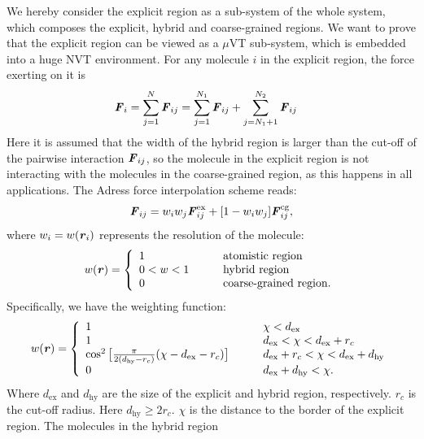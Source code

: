 \documentclass[aps,pre,preprint,unsortedaddress]{revtex4}
\renewcommand{\v}[1]{\textbf{\textit{#1}}}
\begin{document}
We hereby consider the explicit region as a sub-system of the whole
system, which composes the explicit, hybrid and coarse-grained
regions. We want to prove that the explicit region can be viewed as a
$\mu$VT sub-system, which is embedded into a huge NVT environment.
For any molecule $i$ in the explicit region, the force exerting on
it is
\begin{align}
  \v F_i &= \sum_{j=1}^{N}\v F_{ij} 
  =
  \sum_{j=1}^{N_1}\v F_{ij} + \sum_{j=N_1+1}^{N_2}\v F_{ij} 
\end{align}
Here it is assumed that the width of the hybrid region is larger than
the cut-off of the pairwise interaction $\v F_{ij}$, so the molecule
in the explicit region is not interacting with the molecules in the
coarse-grained region, as this happens in all applications.
The Adress force interpolation scheme reads:
\begin{align}\label{eqn:f-interp}
  \v F_{ij} = w_iw_j\v F^{\textrm{ex}}_{ij} + [1-w_iw_j]\v F^{\textrm{cg}}_{ij},
\end{align}
where $w_i = w(\v r_i)$ represents
the resolution of the molecule:
\begin{align}\label{eqn:w1}
  w(\v r) =
  \left\{
    \begin{array}{lcl}
      1 &\quad& \textrm{atomistic region}\\
      0<w<1  && \textrm{hybrid region}\\
      0 && \textrm{coarse-grained region}.
    \end{array}
  \right.
\end{align}
Specifically, we have the weighting function:
\begin{align}\label{eqn:w2}
  w(\v r) =
  \left\{
    \begin{array}{lcl}
      1 &\quad& \chi < d_{\textrm{ex}}\\
      1  && d_{\textrm{ex}} < \chi < d_{\textrm{ex}} + r_c\\
      \cos^2\big[\frac{\pi}{2(d_{\textrm{hy}} - r_c)} (\chi - d_{\textrm{ex}} - r_c)\big] && d_{\textrm{ex}} + r_c < \chi < d_{\textrm{ex}} + d_{\textrm{hy}} \\
      0 && d_{\textrm{ex}} + d_{\textrm{hy}}  < \chi.
    \end{array}
  \right.
\end{align}
Where $d_{\textrm{ex}}$ and $d_{\textrm{hy}}$ are the size of the
explicit and hybrid region, respectively. $r_c$ is the cut-off
radius. Here $d_{\textrm{hy}} \geq 2r_c$. $\chi$ is the distance to
the border of the explicit region.  The molecules in the hybrid region
\end{document}
